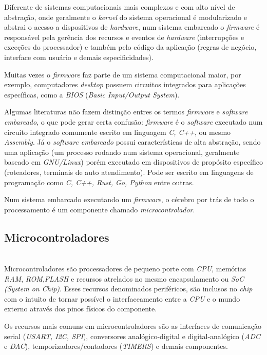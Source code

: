 \documentclass[times, twoside, watermark]{artigo}
\begin{document}
Diferente de sistemas computacionais mais complexos e com alto nível de abstração,
onde geralmente o \textit{kernel} do sistema operacional é modularizado e abstrai
o acesso a dispositivos de \textit{hardware},
num sistema embarcado o \textit{firmware} é responsável pela gerência dos recursos 
e eventos de \textit{hardware} (interrupções e exceções do processador) e também
pelo código da aplicação (regras de negócio, interface com usuário e demais especificidades).

Muitas vezes o \textit{firmware} faz parte de um sistema computacional maior,
por exemplo, computadores \textit{desktop} possuem circuitos integrados para 
aplicações específicas, como a \textit{BIOS} (\textit{Basic Input/Output System}).

Algumas literaturas não fazem distinção entres os termos \textit{firmware} e 
\textit{software embarcado}, o que pode gerar certa confusão: \textit{firmware}
é o \textit{software} executado num circuito integrado comumente escrito em 
linguagem \textit{C, C++}, ou mesmo \textit{Assembly}. Já o \textit{software embarcado} 
possui características de alta abstração, sendo uma aplicação (um processo rodando 
num sistema operacional, geralmente baseado em \textit{GNU/Linux}) porém executado 
em dispositivos de propósito específico (roteadores, terminais de auto atendimento). 
Pode ser escrito em linguagens de programação como \textit{C, C++, Rust, Go, Python} entre outras.

Num sistema embarcado executando um \textit{firmware}, o cérebro por trás de todo o 
processamento é um componente chamado \textit{microcontrolador}.


\subsection{Microcontroladores}\hfill\\

Microcontroladores são processadores de pequeno porte com \textit{CPU}, memórias \textit{RAM},
\textit{ROM},\textit{FLASH} e recursos atrelados no mesmo encapsulamento ou \textit{SoC 
(System on Chip)}.
Esses recursos denominados periféricos, são inclusos no \textit{chip} com o intuito de
tornar possível o interfaceamento entre a \textit{CPU} e o mundo externo através dos 
pinos físicos do componente.

Os recursos mais comuns em microcontroladores são as interfaces de comunicação 
serial (\textit{USART, I2C, SPI}), conversores analógico-digital e digital-analógico 
(\textit{ADC} e \textit{DAC}), temporizadores/contadores (\textit{TIMERS}) e demais componentes.
\end{document}
